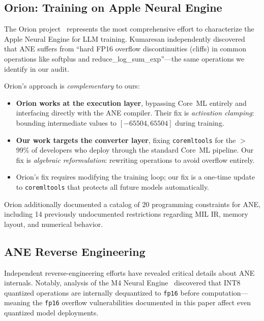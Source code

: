 \documentclass[10pt,twocolumn]{article}
\newcommand{\fp}{\texttt{fp16}}
\newcommand{\ane}{ANE}
\newcommand{\coreml}{Core~ML}
\newcommand{\coremltools}{\texttt{coremltools}}
\begin{document}
\subsection{Orion: Training on Apple Neural Engine}

The Orion project~\citep{kumaresan2026orion} represents the most
comprehensive effort to characterize the Apple Neural Engine for
LLM training.  Kumaresan independently discovered that \ane{}
suffers from ``hard FP16 overflow discontinuities (cliffs) in
common operations like softplus and reduce\_log\_sum\_exp''---the
same operations we identify in our audit.

Orion's approach is \emph{complementary} to ours:

\begin{itemize}[leftmargin=*,itemsep=1pt]
  \item \textbf{Orion works at the execution layer}, bypassing
    \coreml{} entirely and interfacing directly with the \ane{}
    compiler.  Their fix is \emph{activation clamping}: bounding
    intermediate values to $[-65504, 65504]$ during training.

  \item \textbf{Our work targets the converter layer}, fixing
    \coremltools{} for the $>$99\% of developers who deploy
    through the standard \coreml{} pipeline.  Our fix is
    \emph{algebraic reformulation}: rewriting operations to avoid
    overflow entirely.

  \item Orion's fix requires modifying the training loop; our
    fix is a one-time update to \coremltools{} that protects all
    future models automatically.
\end{itemize}

Orion additionally documented a catalog of 20 programming
constraints for \ane{}, including 14 previously undocumented
restrictions regarding MIL IR, memory layout, and numerical
behavior.

\subsection{ANE Reverse Engineering}

Independent reverse-engineering efforts have revealed critical
details about \ane{} internals.  Notably, analysis of the M4
Neural Engine~\citep{maderix2025ane} discovered that INT8 quantized
operations are internally dequantized to \fp{} before
computation---meaning the \fp{} overflow vulnerabilities documented
in this paper affect even quantized model deployments.
\end{document}
